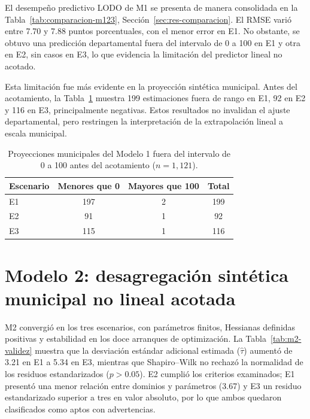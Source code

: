 El desempeño predictivo LODO de M1 se presenta de manera consolidada en la Tabla~\ref{tab:comparacion-m123}, Sección~\ref{sec:res-comparacion}. El RMSE varió entre 7.70 y 7.88 puntos porcentuales, con el menor error en E1. No obstante, se obtuvo una predicción departamental fuera del intervalo de 0 a 100 en E1 y otra en E2, sin casos en E3, lo que evidencia la limitación del predictor lineal no acotado.

Esta limitación fue más evidente en la proyección sintética municipal. Antes del acotamiento, la Tabla~\ref{tab:fh-proyeccion} muestra 199 estimaciones fuera de rango en E1, 92 en E2 y 116 en E3, principalmente negativas. Estos resultados no invalidan el ajuste departamental, pero restringen la interpretación de la extrapolación lineal a escala municipal.

\begin{table}[!htbp]
\centering
\footnotesize
\caption{Proyecciones municipales del Modelo 1 fuera del intervalo de 0 a 100 antes del acotamiento ($n=1{,}121$).}
\label{tab:fh-proyeccion}
\renewcommand{\arraystretch}{1.1}
\setlength{\tabcolsep}{8pt}
\begin{tabular}{l c c c}
\hline
Escenario & Menores que 0 & Mayores que 100 & Total \\
\hline
E1 & 197 & 2 & 199 \\
E2 & 91 & 1 & 92 \\
E3 & 115 & 1 & 116 \\
\hline
\end{tabular}
\end{table}


\section{Modelo 2: desagregación sintética municipal no lineal acotada}
\label{sec:res-m2}

M2 convergió en los tres escenarios, con parámetros finitos, Hessianas definidas positivas y estabilidad en los doce arranques de optimización. La Tabla~\ref{tab:m2-validez} muestra que la desviación estándar adicional estimada ($\hat{\tau}$) aumentó de 3.21 en E1 a 5.34 en E3, mientras que Shapiro--Wilk no rechazó la normalidad de los residuos estandarizados ($p>0.05$). E2 cumplió los criterios examinados; E1 presentó una menor relación entre dominios y parámetros (3.67) y E3 un residuo estandarizado superior a tres en valor absoluto, por lo que ambos quedaron clasificados como aptos con advertencias.

